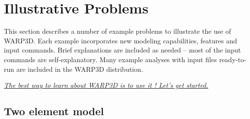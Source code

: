 \documentclass[11pt]{report}
\numberwithin{equation}{section}
\newcommand{\ul} {\underline}
\newcommand{\ti}{\emph}
\begin{document}
\section{Illustrative Problems}
This section describes a number of example problems to illustrate the
use of WARP3D. Each example incorporates new modeling
capabilities, features and input commands. Brief explanations are included as 
needed -- most of 
the input commands are self-explanatory. Many example analyses with input
files ready-to-run are included in the WARP3D distribution.

\ul{\ti{The best way to learn about WARP3D is to use it ! Let's get started.}}

\subsection{Two element model}
\end{document}
